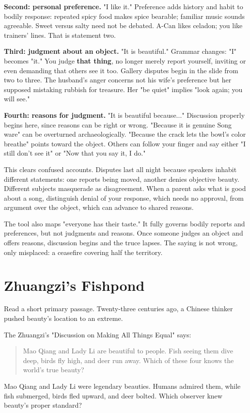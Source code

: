 \textbf{Second: personal preference.} "I like it." Preference adds history and habit to bodily response: repeated spicy food makes spice bearable; familiar music sounds agreeable. Sweet versus salty need not be debated. A-Can likes celadon; you like trainers' lines. That is statement two.

\textbf{Third: judgment about an object.} "It is beautiful." Grammar changes: "I" becomes "it." You judge \textbf{that thing}, no longer merely report yourself, inviting or even demanding that others see it too. Gallery disputes begin in the slide from two to three. The husband's anger concerns not his wife's preference but her supposed mistaking rubbish for treasure. Her "be quiet" implies "look again; you will see."

\textbf{Fourth: reasons for judgment.} "It is beautiful because..." Discussion properly begins here, since reasons can be right or wrong. "Because it is genuine Song ware" can be overturned archaeologically. "Because the crack lets the bowl's color breathe" points toward the object. Others can follow your finger and say either "I still don't see it" or "Now that you say it, I do."

This clears confused accounts. Disputes last all night because speakers inhabit different statements: one reports being moved, another denies objective beauty. Different subjects masquerade as disagreement. When a parent asks what is good about a song, distinguish denial of your response, which needs no approval, from argument over the object, which can advance to shared reasons.

The tool also maps "everyone has their taste." It fully governs bodily reports and preferences, but not judgments and reasons. Once someone judges an object and offers reasons, discussion begins and the truce lapses. The saying is not wrong, only misplaced: a ceasefire covering half the territory.

\section{Zhuangzi's Fishpond}
Read a short primary passage. Twenty-three centuries ago, a Chinese thinker pushed beauty's location to an extreme.

The Zhuangzi's "Discussion on Making All Things Equal" says:

\begin{quote}
Mao Qiang and Lady Li are beautiful to people. Fish seeing them dive deep, birds fly high, and deer run away. Which of these four knows the world's true beauty?
\end{quote}
Mao Qiang and Lady Li were legendary beauties. Humans admired them, while fish submerged, birds fled upward, and deer bolted. Which observer knew beauty's proper standard?

